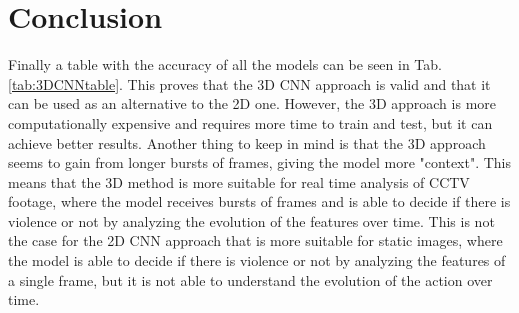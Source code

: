 \chapter{Conclusion}
Finally a table with the accuracy of all the models can be seen in Tab. \ref{tab:3DCNNtable}. This proves that the 3D CNN approach is valid and that it can be used as an alternative to the 2D one. However, the 3D approach is more computationally expensive and requires more time to train and test, but it can achieve better results. Another thing to keep in mind is that the 3D approach seems to gain from longer bursts of frames, giving the model more "context". This means that the 3D method is more suitable for real time analysis of CCTV footage, where the model receives bursts of frames and is able to decide if there is violence or not by analyzing the evolution of the features over time. This is not the case for the 2D CNN approach that is more suitable for static images, where the model is able to decide if there is violence or not by analyzing the features of a single frame, but it is not able to understand the evolution of the action over time.

\begin{table}[h]
    \centering
    \caption{Models accuracy}
    \label{tab:3DCNNtable}
\end{table}
